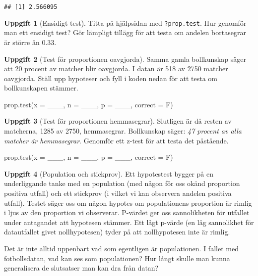 \documentclass[
]{book}
\newenvironment{Shaded}{\begin{snugshade}}{\end{snugshade}}
\newcommand{\AttributeTok}[1]{\textcolor[rgb]{0.77,0.63,0.00}{#1}}
\newcommand{\FunctionTok}[1]{\textcolor[rgb]{0.00,0.00,0.00}{#1}}
\newcommand{\NormalTok}[1]{#1}
\theoremstyle{definition}
\theoremstyle{definition}
\theoremstyle{definition}
\newtheorem{exercise}{Uppgift}[chapter]
\theoremstyle{definition}
\theoremstyle{remark}
\begin{document}
\begin{verbatim}
## [1] 2.566095
\end{verbatim}

\begin{exercise}[Ensidigt test]
Titta på hjälpsidan med \texttt{?prop.test}. Hur genomför man ett ensidigt test? Gör lämpligt tillägg för att testa om andelen bortasegrar är större än 0.33.
\end{exercise}

\begin{exercise}[Test för proportionen oavgjorda]

Samma gamla bollkunskap säger att 20 procent av matcher blir oavgjorda. I datan är 518 av 2750 matcher oavgjorda. Ställ upp hypoteser och fyll i koden nedan för att testa om bollkunskapen stämmer.

\begin{Shaded}
\begin{Highlighting}[]
\FunctionTok{prop.test}\NormalTok{(}\AttributeTok{x =}\NormalTok{ \_\_\_, }\AttributeTok{n =}\NormalTok{ \_\_\_, }\AttributeTok{p =}\NormalTok{ \_\_\_, }\AttributeTok{correct =}\NormalTok{ F)}
\end{Highlighting}
\end{Shaded}

\end{exercise}

\begin{exercise}[Test för proportionen hemmasegrar]

Slutligen är då resten av matcherna, 1285 av 2750, hemmasegrar. Bollkunskap säger: \emph{47 procent av alla matcher är hemmasegrar}. Genomför ett z-test för att testa det påstående.

\begin{Shaded}
\begin{Highlighting}[]
\FunctionTok{prop.test}\NormalTok{(}\AttributeTok{x =}\NormalTok{ \_\_\_, }\AttributeTok{n =}\NormalTok{ \_\_\_, }\AttributeTok{p =}\NormalTok{ \_\_\_, }\AttributeTok{correct =}\NormalTok{ F)}
\end{Highlighting}
\end{Shaded}

\end{exercise}

\begin{exercise}[Population och stickprov]
Ett hypotestest bygger på en underliggande tanke med en population (med någon för oss okänd proportion positiva utfall) och ett stickprov (i vilket vi kan observera andelen positiva utfall). Testet säger oss om någon hypotes om populationens proportion är rimlig i ljus av den proportion vi observerar. P-värdet ger oss sannolikheten för utfallet under antagandet att hypotesen stämmer. Ett lågt p-värde (en låg sannolikhet för datautfallet givet nollhypotesen) tyder på att nollhypotesen inte är rimlig.

Det är inte alltid uppenbart vad som egentligen är populationen. I fallet med fotbollsdatan, vad kan ses som populationen? Hur långt skulle man kunna generalisera de slutsatser man kan dra från datan?
\end{exercise}
\end{document}
